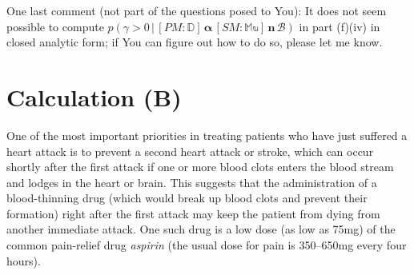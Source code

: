 \documentclass[12pt]{article}
\newcommand{\given}{\, | \,}
\begin{document}
One last comment (not part of the questions posed to You): It does not seem possible to compute $p ( \gamma > 0 \given [ PM \! \! : \mathbb{ D } ] \, \bm{ \alpha } \, [ SM \! \! : \mathbb{ Mu } ] \, \bm{ n } \, \mathcal{ B } )$ in part (f)(iv) in closed analytic form; if You can figure out how to do so, please let me know.

\addtocounter{section}{-1}

\section{Calculation (B)}

 \vspace*{0.025in} One of the most important priorities in treating patients who have just suffered a heart attack is to prevent a second heart attack or stroke, which can occur shortly after the first attack if one or more blood clots enters the blood stream and lodges in the heart or brain. This suggests that the administration of a blood-thinning drug (which would break up blood clots and prevent their formation) right after the first attack may keep the patient from dying from another immediate attack. One such drug is a low dose (as low as 75mg) of the common pain-relief drug \textit{aspirin} (the usual dose for pain is 350--650mg every four hours). 
\end{document}
